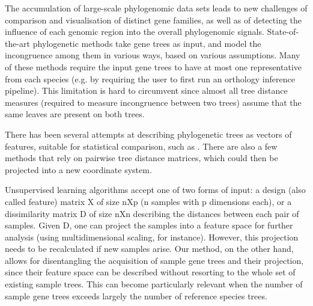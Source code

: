 
The accumulation of large-scale phylogenomic data sets leads to new challenges of comparison and visualisation of
distinct gene families, as well as of detecting the influence of each genomic region into the overall phylogenomic
signals. 
State-of-the-art phylogenetic methods take gene trees as input, and model the incongruence among them in
various ways, based on various assumptions. 
Many of these methods require the input gene trees to have at most one
representative from each species (e.g. by requiring the user to first run an orthology inference pipeline). This
limitation is hard to circumvent since almost all tree distance measures (required to measure incongruence between two
trees) assume that the same leaves are present on both trees.

There has been several attempts at describing phylogenetic trees as vectors of features, suitable for statistical
comparison, such as \cite{Leigh2008, Leigh2011, Susko2006, Narechania2016, Nye2011, Yoshida2015, Lewitus2015,
Kendall2016, Colijn2018}. 
There are also a few methods that rely on pairwise tree distance matrices, which could then be projected into a new
coordinate system.

Unsupervised learning algorithms accept one of two forms of input: a design (also called feature) matrix X of size nXp
(n samples with p dimensions each), or a dissimilarity matrix D of size nXn describing the distances between each pair
of samples. Given D, one can project the samples into a feature space for further analysis (using multidimensional
scaling, for instance). However, this projection needs to be recalculated if new samples arise. Our method, on the other
hand, allows for disentangling the acquisition of sample gene trees and their projection, since their feature space can
be described without resorting to the whole set of existing sample trees. This can become particularly relevant when the
number of sample gene trees exceeds largely the number of reference species trees.

